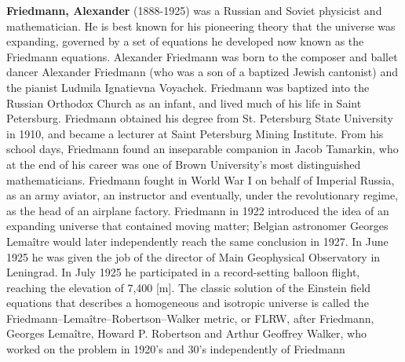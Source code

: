 \textbf{Friedmann, Alexander} (1888-1925) was a Russian and Soviet physicist and mathematician. He is best known for his pioneering theory that the universe was expanding, governed by a set of equations he developed now known as the Friedmann equations.  Alexander Friedmann was born to the composer and ballet dancer Alexander Friedmann (who was a son of a baptized Jewish cantonist) and the pianist Ludmila Ignatievna Voyachek. Friedmann was baptized into the Russian Orthodox Church as an infant, and lived much of his life in Saint Petersburg. Friedmann obtained his degree from St. Petersburg State University in 1910, and became a lecturer at Saint Petersburg Mining Institute. From his school days, Friedmann found an inseparable companion in Jacob Tamarkin, who at the end of his career was one of Brown University's most distinguished mathematicians. Friedmann fought in World War I on behalf of Imperial Russia, as an army aviator, an instructor and eventually, under the revolutionary regime, as the head of an airplane factory. Friedmann in 1922 introduced the idea of an expanding universe that contained moving matter; Belgian astronomer Georges Lemaître would later independently reach the same conclusion in 1927. In June 1925 he was given the job of the director of Main Geophysical Observatory in Leningrad. In July 1925 he participated in a record-setting balloon flight, reaching the elevation of 7,400 [m]. The classic solution of the Einstein field equations that describes a homogeneous and isotropic universe is called the Friedmann–Lemaître–Robertson–Walker metric, or FLRW, after Friedmann, Georges Lemaître, Howard P. Robertson and Arthur Geoffrey Walker, who worked on the problem in 1920's and 30's independently of Friedmann

{}
\label{sec:G}


